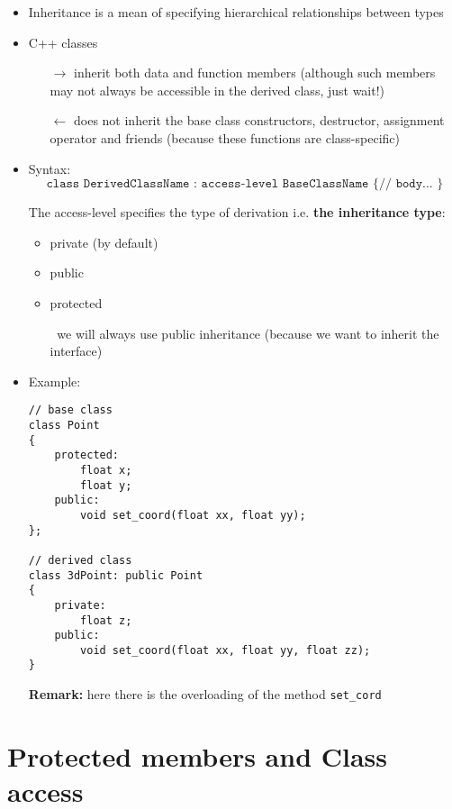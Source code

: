 \begin{itemize}
\item Inheritance is a mean of specifying hierarchical relationships between types

\item C++ classes

\begin{itemize}
    \item[$\rightarrow$] inherit both data and function members (although such members may not always be accessible in the derived class, just wait!)

    \item[$\leftarrow$] does not inherit the base class constructors, destructor, assignment operator and friends (because these functions are class-specific)
\end{itemize}

\item Syntax:
\begin{equation*}
\texttt{class DerivedClassName : access-level BaseClassName \{ // body... \} }
\end{equation*}

The access-level specifies the type of derivation i.e. \textbf{the inheritance type}:
\begin{itemize}
    \item private (by default)
    \item public
    \item protected

    \danger$\ $ we will always use public inheritance (because we want to inherit the interface)
\end{itemize}

\item Example:
\begin{lstlisting}
// base class
class Point
{
    protected:
        float x;
        float y;
    public:
        void set_coord(float xx, float yy);
};

// derived class
class 3dPoint: public Point
{
    private:
        float z;
    public:
        void set_coord(float xx, float yy, float zz);
}
\end{lstlisting}

\textbf{Remark:} here there is the overloading of the method \texttt{set\_cord}

\end{itemize}


\section{Protected members and Class access} %
\label{sec:protected_members_and_class_access}

